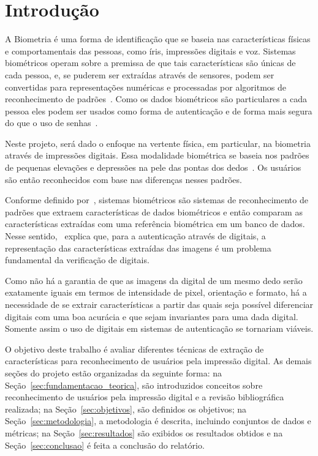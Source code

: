 \section{Introdução}\label{sec:introduacao}

A Biometria é uma forma de identificação que se baseia nas características físicas e comportamentais das pessoas, como íris, impressões digitais e voz. Sistemas biométricos operam sobre a premissa de que tais características são únicas de cada pessoa, e, se puderem ser extraídas através de sensores, podem ser convertidas para representações numéricas e processadas por algoritmos de reconhecimento de padrões~\cite{handbook_of_biometrics}. Como os dados biométricos são particulares a cada pessoa eles podem ser usados como forma de autenticação e de forma mais segura do que o uso de senhas~\cite{biometrics_a_tool_for_information_security}. 

Neste projeto, será dado o enfoque na vertente física, em particular, na biometria através de impressões digitais. Essa modalidade biométrica se baseia nos padrões de pequenas elevações e depressões na pele das pontas dos dedos~\cite{handbook_of_fp_recognition}. Os usuários são então reconhecidos com base nas diferenças nesses padrões.

Conforme definido por~, sistemas biométricos são sistemas de reconhecimento de padrões que extraem características de dados biométricos e então comparam as características extraídas com uma referência biométrica em um banco de dados. Nesse sentido,~ explica que, para a autenticação através de digitais, a representação das características extraídas das imagens é um problema fundamental da verificação de digitais. 

Como não há a garantia de que as imagens da digital de um mesmo dedo serão exatamente iguais em termos de intensidade de pixel, orientação e formato, há a necessidade de se extrair características a partir das quais seja possível diferenciar digitais com uma boa acurácia e que sejam invariantes para uma dada digital. Somente assim o uso de digitais em sistemas de autenticação se tornariam viáveis.

O objetivo deste trabalho é avaliar diferentes técnicas de extração de características para reconhecimento de usuários pela impressão digital. As demais seções do projeto estão organizadas da seguinte forma: na Seção~\ref{sec:fundamentacao_teorica}, são introduzidos conceitos sobre reconhecimento de usuários pela impressão digital e a revisão bibliográfica realizada; na Seção~\ref{sec:objetivos}, são definidos os objetivos; na Seção~\ref{sec:metodologia}, a metodologia é descrita, incluindo conjuntos de dados e métricas; na Seção~\ref{sec:resultados} são exibidos os resultados obtidos e na Seção~\ref{sec:conclusao} é feita a conclusão do relatório.
